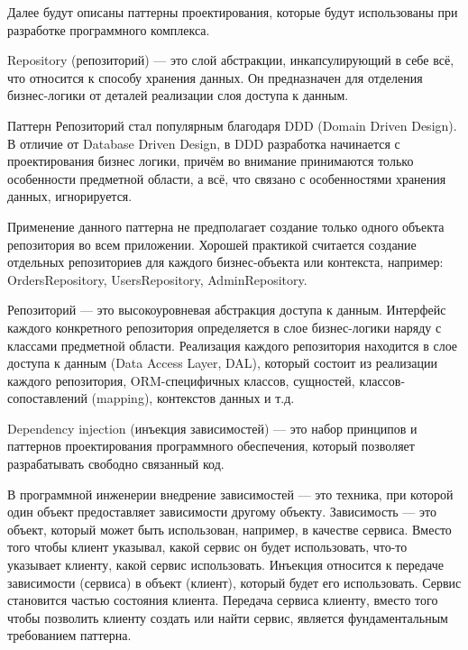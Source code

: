 Далее будут описаны паттерны проектирования, которые будут использованы при разработке программного комплекса.



Repository (репозиторий) \cite{repository_pattern} --- это слой абстракции, инкапсулирующий в себе всё, что относится к способу хранения данных. Он предназначен для отделения бизнес-логики от деталей реализации слоя доступа к данным.

Паттерн Репозиторий стал популярным благодаря DDD (Domain Driven Design). В отличие от Database Driven Design, в DDD разработка начинается с проектирования бизнес логики, причём во внимание принимаются только особенности предметной области, а всё, что связано с особенностями хранения данных, игнорируется.

Применение данного паттерна не предполагает создание только одного объекта репозитория во всем приложении. Хорошей практикой считается создание отдельных репозиториев для каждого бизнес-объекта или контекста, например: OrdersRepository, UsersRepository, AdminRepository.

Репозиторий --- это высокоуровневая абстракция доступа к данным. Интерфейс каждого конкретного репозитория определяется в слое бизнес-логики наряду с классами предметной области. Реализация каждого репозитория находится в слое доступа к данным (Data Access Layer, DAL), который состоит из реализации каждого репозитория, ORM-специфичных классов, сущностей, классов-сопоставлений (mapping), контекстов данных и т.д.



Dependency injection (инъекция зависимостей) \cite{dependency_injection} --- это набор принципов и паттернов проектирования программного обеспечения, который позволяет разрабатывать свободно связанный код.

В программной инженерии внедрение зависимостей --- это техника, при которой один объект предоставляет зависимости другому объекту. Зависимость --- это объект, который может быть использован, например, в качестве сервиса. Вместо того чтобы клиент указывал, какой сервис он будет использовать, что-то указывает клиенту, какой сервис использовать. Инъекция относится к передаче зависимости (сервиса) в объект (клиент), который будет его использовать. Сервис становится частью состояния клиента. Передача сервиса клиенту, вместо того чтобы позволить клиенту создать или найти сервис, является фундаментальным требованием паттерна.

